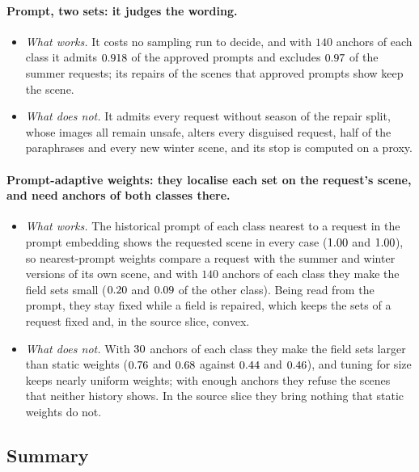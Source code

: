 \documentclass{article}
\theoremstyle{plain}
\theoremstyle{remark}
\begin{document}
\paragraph{Prompt, two sets: it judges the wording.}
\begin{itemize}
\item \emph{What works.} It costs no sampling run to decide, and with $140$ anchors of each class it admits $0.918$ of the approved
prompts and excludes $0.97$ of the summer requests; its repairs of the scenes that approved prompts show keep the scene.
\item \emph{What does not.} It admits every request without season of the repair split, whose images all remain unsafe, alters every
disguised request, half of the paraphrases and every new winter scene, and its stop is computed on a proxy.
\end{itemize}


\paragraph{Prompt-adaptive weights: they localise each set on the request's scene, and need anchors of both classes there.}
\begin{itemize}
\item \emph{What works.} The historical prompt of each class nearest to a request in the prompt embedding shows the requested scene in
every case ($1.00$ and $1.00$), so nearest-prompt weights compare a request with the summer and winter versions of its own
scene, and with $140$ anchors of each class they make the field sets small ($0.20$ and $0.09$ of the other class).
Being read from the prompt, they stay fixed while a field is repaired, which keeps the sets of a request fixed and, in the source slice,
convex.
\item \emph{What does not.} With $30$ anchors of each class they make the field sets larger than static weights
($0.76$ and $0.68$ against $0.44$ and $0.46$), and tuning for size keeps nearly
uniform weights; with enough anchors they refuse the scenes that neither history shows. In the source slice they bring nothing that static
weights do not.
\end{itemize}

\subsection{Summary}\label{sec:e3u_summary}
\end{document}
